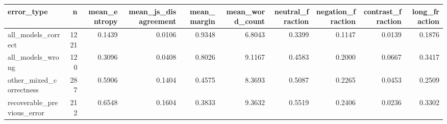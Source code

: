\begin{tabular}{lrrrrrrrrr}
\toprule
error\_type & n & mean\_entropy & mean\_js\_disagreement & mean\_margin & mean\_word\_count & neutral\_fraction & negation\_fraction & contrast\_fraction & long\_fraction \\
\midrule
all\_models\_correct & 1221 & 0.1439 & 0.0106 & 0.9348 & 6.8043 & 0.3399 & 0.1147 & 0.0139 & 0.1876 \\
all\_models\_wrong & 120 & 0.3096 & 0.0408 & 0.8026 & 9.1167 & 0.4583 & 0.2000 & 0.0667 & 0.3417 \\
other\_mixed\_correctness & 287 & 0.5906 & 0.1404 & 0.4575 & 8.3693 & 0.5087 & 0.2265 & 0.0453 & 0.2509 \\
recoverable\_previous\_error & 212 & 0.6548 & 0.1604 & 0.3833 & 9.3632 & 0.5519 & 0.2406 & 0.0236 & 0.3302 \\
\bottomrule
\end{tabular}

